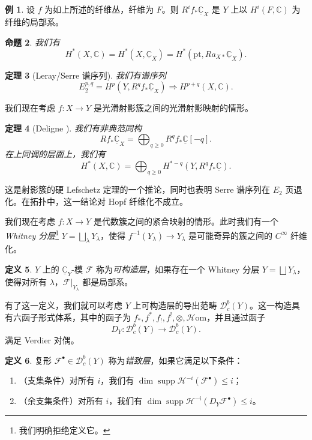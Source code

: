 \documentclass{amsart}
\newtheorem{thm}{定理}[section]
\newtheorem{prop}[thm]{命题}
\theoremstyle{definition}
\newtheorem{defn}[thm]{定义}
\newtheorem{exm}[thm]{例}
\theoremstyle{remark}
\theoremstyle{plain}
\theoremstyle{definition}
\theoremstyle{remark}
\newcommand{\C}{\mathbb{C}}
\newcommand{\mc}[1]{\mathcal{#1}}
\newcommand{\mr}[1]{\mathrm{#1}}
\newcommand{\on}[1]{\operatorname{#1}}
\newcommand{\ul}[1]{\underline{#1}}
\newcommand{\1}{\mathbf{1}}
\newcommand{\2}{\mathbf{2}}
\newcommand{\3}{\mathbf{3}}
\begin{document}
\begin{exm}
    设 \(f\) 为如上所述的纤维丛，纤维为 \(F\)。则 \(R^i f_* \ul{\C}_X\) 是 \(Y\) 上以 \(H^i(F, \C)\) 为纤维的局部系。
\end{exm}

\begin{prop}
    我们有
    \[ H^*(X, \C) = H^*(X, \ul{\C}_X) = H^*(\mr{pt}, R a_{X*} \ul{\C}_X). \]
\end{prop}

\begin{thm}[Leray/Serre 谱序列]
    我们有谱序列
    \[ E_2^{p,q} = H^p(Y, R^q f_* \ul{\C}_X) \Rightarrow H^{p+q}(X, \C). \]
\end{thm}

我们现在考虑 \(f \colon X \to Y\) 是光滑射影簇之间的光滑射影映射的情形。

\begin{thm}[Deligne {\cite{Deligne1968}}]
    我们有非典范同构
    \[ R f_* \ul{\C}_X = \bigoplus_{q \geq 0} R^q f_* \ul{\C}[-q]. \]
    在上同调的层面上，我们有
    \[ H^*(X, \C) = \bigoplus_{q \geq 0} H^{*-q}(Y, R^q f_* \ul{\C}). \]
\end{thm}

这是射影簇的硬 Lefschetz 定理的一个推论，同时也表明 Serre 谱序列在 \(E_2\) 页退化。在拓扑中，这一结论对 Hopf 纤维化不成立。

我们现在考虑 \(f \colon X \to Y\) 是代数簇之间的紧合映射的情形。此时我们有一个 \textit{Whitney 分层}\footnote{我们明确拒绝定义它。} \(Y = \bigsqcup_{\lambda} Y_{\lambda}\)，使得 \(f^{-1}(Y_{\lambda}) \to Y_{\lambda}\) 是可能奇异的簇之间的 \(C^{\infty}\) 纤维化。

\begin{defn}
    \(Y\) 上的 \(\ul{\C}_Y\)-模 \(\mc{F}\) 称为\textit{可构造层}，如果存在一个 Whitney 分层 \(Y = \bigsqcup Y_{\lambda}\)，使得对所有 \(\lambda\)，\(\mc{F}|_{Y_{\lambda}}\) 都是局部系。
\end{defn}

有了这一定义，我们就可以考虑 \(Y\) 上可构造层的导出范畴 \(\mc{D}_c^b(Y)\)。这一构造具有六函子形式体系，其中的函子为 \(f_*, f^*, f_!, f^!, \otimes, \mc{H}\mr{om}\)，并且通过函子
\[ D_Y \colon \mc{D}_c^b(Y) \to \mc{D}_c^b(Y). \]
满足 Verdier 对偶。

\begin{defn}
    复形 \(\mc{F}^{\bullet} \in \mc{D}_c^b(Y)\) 称为\textit{错致层}，如果它满足以下条件：
    \begin{enumerate}
        \item （支集条件）对所有 \(i\)，我们有 \(\dim \on{supp} \mc{H}^{-i}(\mc{F}^{\bullet}) \leq i\)；
        \item （余支集条件）对所有 \(i\)，我们有 \(\dim \on{supp} \mc{H}^{-i}(D_Y \mc{F}^{\bullet}) \leq i\)。
    \end{enumerate}
\end{defn}
\end{document}
